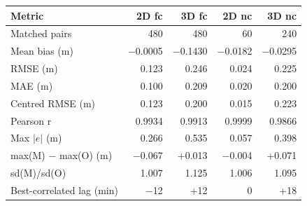 \begin{tabular}{lrrrr}
\hline
Metric & 2D fc & 3D fc & 2D nc & 3D nc \\
\hline
Matched pairs & 480 & 480 & 60 & 240 \\
Mean bias (m) & $-$0.0005 & $-$0.1430 & $-$0.0182 & $-$0.0295 \\
RMSE (m) & 0.123 & 0.246 & 0.024 & 0.225 \\
MAE (m) & 0.100 & 0.209 & 0.020 & 0.200 \\
Centred RMSE (m) & 0.123 & 0.200 & 0.015 & 0.223 \\
Pearson r & 0.9934 & 0.9913 & 0.9999 & 0.9866 \\
Max $|e|$ (m) & 0.266 & 0.535 & 0.057 & 0.398 \\
max(M) $-$ max(O) (m) & $-$0.067 & +0.013 & $-$0.004 & +0.071 \\
sd(M)/sd(O) & 1.007 & 1.125 & 1.006 & 1.095 \\
Best-correlated lag (min) & $-$12 & +12 & 0 & +18 \\
\hline
\end{tabular}

